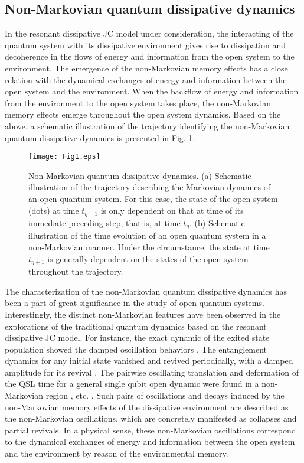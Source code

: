 \documentclass[
showpacs,  %
showkeys,  %
aps,       %
amsthm,    %
amsmath,   %
amsfonts,  %
amssymb    %
]{revtex4-1}          %
\begin{document}
\subsection{Non-Markovian quantum dissipative dynamics}
\label{Subsec:41}
In the resonant dissipative JC model under consideration, the interacting of the quantum system with its dissipative environment gives rise to dissipation and decoherence in the flows of energy and information from the open system to the environment. The emergence of the non-Markovian memory effects has a close relation with the dynamical exchanges of energy and information between the open system and the environment. When the backflow of energy and information from the environment to the open system takes place, the non-Markovian memory effects emerge throughout the open system dynamics. Based on the above, a schematic illustration of the trajectory identifying the non-Markovian quantum dissipative dynamics is presented in Fig. \ref{Fig1}.
\begin{figure}
\texttt{[image: Fig1.eps]}
\caption{Non-Markovian quantum dissipative dynamics. (a) Schematic illustration of the trajectory describing the Markovian dynamics of an open quantum system. For this case, the state of the open system (dots) at time ${t_{\eta  + 1}}$ is only dependent on that at time of its immediate preceding step, that is, at time ${t_\eta }$. (b) Schematic illustration of the time evolution of an open quantum system in a non-Markovian manner. Under the circumstance, the state at time ${t_{\eta  + 1}}$ is generally dependent on the states of the open system throughout the trajectory.}
\label{Fig1}
\end{figure}

The characterization of the non-Markovian quantum dissipative dynamics has been a part of great significance in the study of open quantum systems. Interestingly, the distinct non-Markovian features have been observed in the explorations of the traditional quantum dynamics based on the resonant dissipative JC model. For instance, the exact dynamic of the exited state population showed the damped oscillation behaviors \cite{Maniscalco2006,Ferraro2009}. The entanglement dynamics for any initial state vanished and revived periodically, with a damped amplitude for its revival \cite{Bellomo2007,Addis2016}. The pairwise oscillating translation and deformation of the QSL time for a general single qubit open dynamic were found in a non-Markovian region \cite{Deffner2013,Teittinen2019}, etc. \cite{XuZY2014,CaiXJ2017,Naikoo2020}. Such pairs of oscillations and decays induced by the non-Markovian memory effects of the dissipative environment are described as the non-Markovian oscillations, which are concretely manifested as collapses and partial revivals. In a physical sense, these non-Markovian oscillations correspond to the dynamical exchanges of energy and information between the open system and the environment by reason of the environmental memory.
\end{document}
